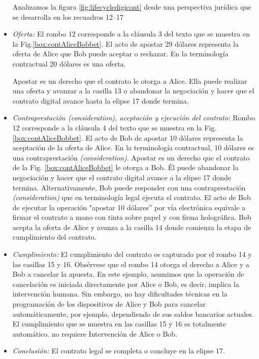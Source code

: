 \documentclass[12pt]{report} %
\begin{document}
\begin{itemize}
Analizamos la figura \ref{fig:lifecycledigicont} desde una perspectiva jurídica que se desarrolla en los recuadros 12--17

  \item \emph{ Oferta:} El rombo 12 corresponde a la cláusula 3 del texto que se muestra en la Fig.\ref{box:contAliceBobbet}. El acto de apostar 29 dólares representa la oferta de Alice que Bob puede aceptar o rechazar. En la terminología contractual 20 dólares es una oferta.


  Apostar es un derecho que el contrato le otorga a Alice. Ella puede realizar una oferta y avanzar a la casilla 13 o abandonar la negociación y hacer que el contrato digital avance hasta la elipse 17 donde termina.


   \item \emph{ Contraprestación (consideration), aceptación y ejecución del contrato:} Rombo 12 corresponde a la cláusula 4 del texto que se muestra en la Fig. \ref{box:contAliceBobbet}. El acto de Bob de apostar 10 dólares representa la aceptación de la oferta de Alice. En la terminología contractual, 10 dólares es una contraprestación \textit{(consideration)}. Apostar es un derecho que el contrato de la Fig. \ref{box:contAliceBobbet} le otorga a Bob. Él puede abandonar la negociación y hacer que el contrato digital avance a la elipse 17 donde termina. Alternativamente, Bob puede responder con una contraprestación \textit{(consideration)} que en terminología legal ejecuta el contrato. El acto de Bob de ejecutar la operación "apostar 10 dólares” por vía electrónica equivale a firmar el contrato a mano con tinta sobre papel y con firma holográfica. Bob acepta la oferta de Alice y avanza a la casilla 14 donde comienza la etapa de cumplimiento del contrato.

  \item \emph{ Cumplimiento:} El cumplimiento del contrato es capturado por el rombo 14 y las casillas 15 y 16. Obsérvese que el rombo 14 otorga el derecho a Alice y a Bob a cancelar la apuesta. En este ejemplo, asumimos que la operación de cancelación es iniciada directamente por Alice o Bob, es decir, implica la intervención humana. Sin embargo, no hay dificultades técnicas en la programación de los dispositivos de Alice y Bob para cancelar automáticamente, por ejemplo, dependiendo de sus saldos bancarios actuales. El cumplimiento que se muestra en las casillas 15 y 16 es totalmente automático. no requiere Intervención de Alice o Bob.

  \item \emph{ Conclusión:} El contrato legal se completa o concluye en la elipse 17.

   
\end{itemize}
\end{document}

